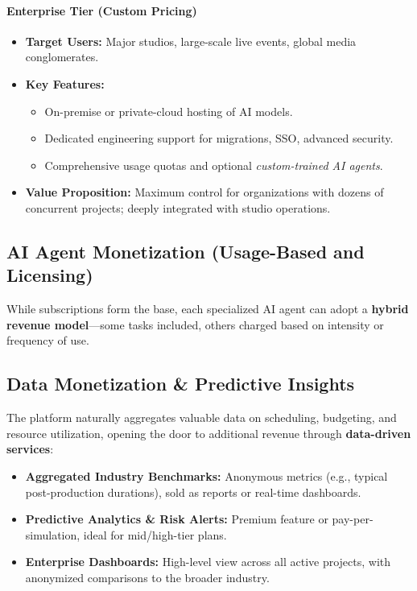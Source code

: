 \documentclass[11pt]{article}
\begin{document}
\paragraph{Enterprise Tier (Custom Pricing)}
\begin{itemize}
    \item \textbf{Target Users:} Major studios, large-scale live events, global media conglomerates.
    \item \textbf{Key Features:}
    \begin{itemize}
        \item On-premise or private-cloud hosting of AI models.
        \item Dedicated engineering support for migrations, SSO, advanced security.
        \item Comprehensive usage quotas and optional \emph{custom-trained AI agents}.
    \end{itemize}
    \item \textbf{Value Proposition:} Maximum control for organizations with dozens of concurrent projects; deeply integrated with studio operations.
\end{itemize}

\subsection{AI Agent Monetization (Usage-Based and Licensing)}
While subscriptions form the base, each specialized AI agent can adopt a \textbf{hybrid revenue model}—some tasks included, others charged based on intensity or frequency of use.

\subsection{Data Monetization \& Predictive Insights}
The platform naturally aggregates valuable data on scheduling, budgeting, and resource utilization, opening the door to additional revenue through \textbf{data-driven services}:
\begin{itemize}
    \item \textbf{Aggregated Industry Benchmarks:} Anonymous metrics (e.g., typical post-production durations), sold as reports or real-time dashboards.
    \item \textbf{Predictive Analytics \& Risk Alerts:} Premium feature or pay-per-simulation, ideal for mid/high-tier plans.
    \item \textbf{Enterprise Dashboards:} High-level view across all active projects, with anonymized comparisons to the broader industry.
\end{itemize}
\end{document}
